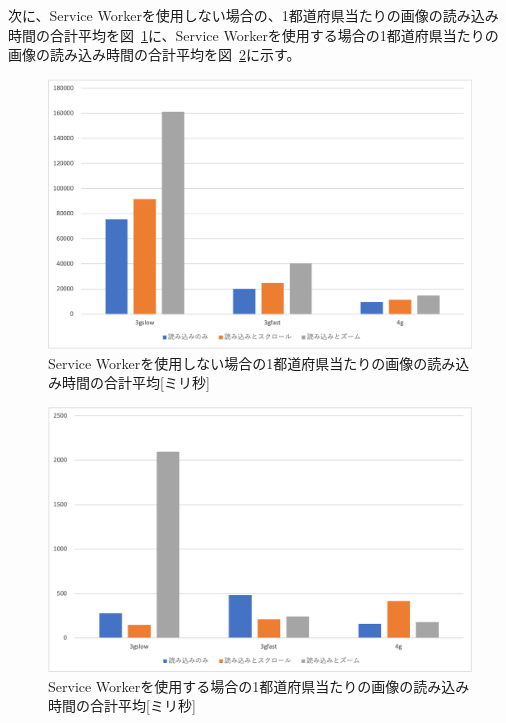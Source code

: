 次に、Service Workerを使用しない場合の、1都道府県当たりの画像の読み込み時間の合計平均を図~\ref{figure:Service Workerを使用しない場合の1都道府県当たりの画像の読み込み時間の合計平均}に、Service Workerを使用する場合の1都道府県当たりの画像の読み込み時間の合計平均を図~\ref{figure:Service Workerを使用する場合の1都道府県当たりの画像の読み込み時間の合計平均}に示す。

\begin{figure}
  \centering
  \includegraphics[width=\textwidth]{paper/images/sum_of_image_durations_without_service_worker.png}
  \caption{Service Workerを使用しない場合の1都道府県当たりの画像の読み込み時間の合計平均[ミリ秒]}\label{figure:Service Workerを使用しない場合の1都道府県当たりの画像の読み込み時間の合計平均}
\end{figure}

\begin{figure}
  \centering
  \includegraphics[width=\textwidth]{paper/images/sum_of_image_durations_with_service_worker.png}
  \caption{Service Workerを使用する場合の1都道府県当たりの画像の読み込み時間の合計平均[ミリ秒]}\label{figure:Service Workerを使用する場合の1都道府県当たりの画像の読み込み時間の合計平均}
\end{figure}

